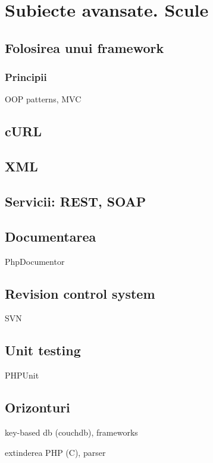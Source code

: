 \chapter{Subiecte avansate. Scule}
\section{Folosirea unui framework}
\subsection{Principii}
OOP patterns, MVC
\section{cURL}
\section{XML}
\section{Servicii: REST, SOAP}
\section{Documentarea}
PhpDocumentor
\section{Revision control system}
SVN
\section{Unit testing}
PHPUnit
\section{Orizonturi}
key-based db (couchdb), frameworks

extinderea PHP (C), parser